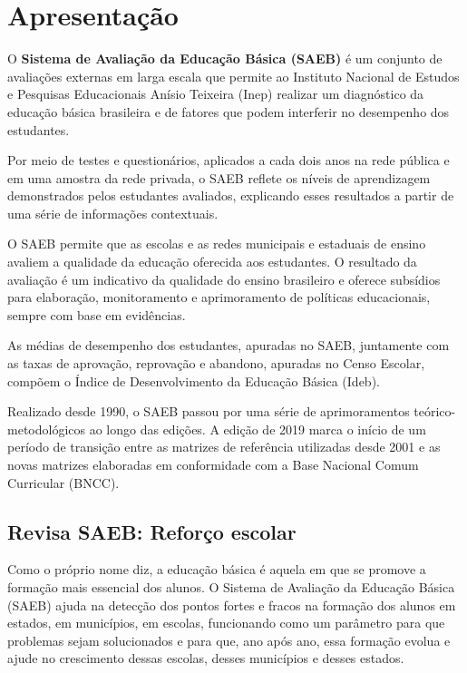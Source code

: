 
\chapter*{Apresentação}

O \textbf{Sistema de Avaliação da Educação Básica (SAEB)} é um conjunto
de avaliações externas em larga escala que permite ao Instituto Nacional
de Estudos e Pesquisas Educacionais Anísio Teixeira (Inep) realizar um
diagnóstico da educação básica brasileira e de fatores que podem
interferir no desempenho dos estudantes.

Por meio de testes e questionários, aplicados a cada dois anos na rede
pública e em uma amostra da rede privada, o SAEB reflete os níveis de
aprendizagem demonstrados pelos estudantes avaliados, explicando esses
resultados a partir de uma série de informações contextuais.

O SAEB permite que as escolas e as redes municipais e estaduais de
ensino avaliem a qualidade da educação oferecida aos estudantes. O
resultado da avaliação é um indicativo da qualidade do ensino brasileiro
e oferece subsídios para elaboração, monitoramento e aprimoramento de
políticas educacionais, sempre com base em evidências.

As médias de desempenho dos estudantes, apuradas no SAEB, juntamente com
as taxas de aprovação, reprovação e abandono, apuradas no Censo Escolar,
compõem o Índice de Desenvolvimento da Educação Básica (Ideb).

Realizado desde 1990, o SAEB passou por uma série de aprimoramentos
teórico-metodológicos ao longo das edições. A edição de 2019 marca o
início de um período de transição entre as matrizes de referência
utilizadas desde 2001 e as novas matrizes elaboradas em conformidade com
a Base Nacional Comum Curricular (BNCC).

\section*{Revisa SAEB: Reforço escolar}

Como o próprio nome diz, a educação básica é aquela em que se promove a
formação mais essencial dos alunos. O Sistema de Avaliação da Educação
Básica (SAEB) ajuda na detecção dos pontos fortes e fracos na formação
dos alunos em estados, em municípios, em escolas, funcionando como um
parâmetro para que problemas sejam solucionados e para que, ano após
ano, essa formação evolua e ajude no crescimento dessas escolas, desses
municípios e desses estados.

